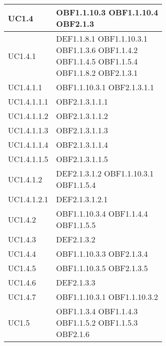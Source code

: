 \documentclass{scalatekids-article}
\begin{document}
\begin{longtable}[H]{|p{5.5cm}|p{5.5cm}|}
\hline
UC1.4 & \multiLineCell[t]{OBF1.1.10.3 OBF1.1.10.4\\OBF2.1.3}\\
\hline
UC1.4.1 & \multiLineCell[t]{DEF1.1.8.1 OBF1.1.10.3.1\\OBF1.1.3.6 OBF1.1.4.2\\OBF1.1.4.5 OBF1.1.5.4\\OBF1.1.8.2 OBF2.1.3.1\\}\\
\hline
UC1.4.1.1 & \multiLineCell[t]{OBF1.1.10.3.1 OBF2.1.3.1.1\\}\\
\hline
UC1.4.1.1.1 & \multiLineCell[t]{OBF2.1.3.1.1.1\\}\\
\hline
UC1.4.1.1.2 & \multiLineCell[t]{OBF2.1.3.1.1.2\\}\\
\hline
UC1.4.1.1.3 & \multiLineCell[t]{OBF2.1.3.1.1.3\\}\\
\hline
UC1.4.1.1.4 & \multiLineCell[t]{OBF2.1.3.1.1.4\\}\\
\hline
UC1.4.1.1.5 & \multiLineCell[t]{OBF2.1.3.1.1.5\\}\\
\hline
UC1.4.1.2 & \multiLineCell[t]{DEF2.1.3.1.2 OBF1.1.10.3.1\\OBF1.1.5.4}\\
\hline
UC1.4.1.2.1 & \multiLineCell[t]{DEF2.1.3.1.2.1\\}\\
\hline
UC1.4.2 & \multiLineCell[t]{OBF1.1.10.3.4 OBF1.1.4.4\\OBF1.1.5.5}\\
\hline
UC1.4.3 & \multiLineCell[t]{DEF2.1.3.2\\}\\
\hline
UC1.4.4 & \multiLineCell[t]{OBF1.1.10.3.3 OBF2.1.3.4\\}\\
\hline
UC1.4.5 & \multiLineCell[t]{OBF1.1.10.3.5 OBF2.1.3.5\\}\\
\hline
UC1.4.6 & \multiLineCell[t]{DEF2.1.3.3\\}\\
\hline
UC1.4.7 & \multiLineCell[t]{OBF1.1.10.3.1 OBF1.1.10.3.2\\}\\
\hline
UC1.5 & \multiLineCell[t]{OBF1.1.3.4 OBF1.1.4.3\\OBF1.1.5.2 OBF1.1.5.3\\OBF2.1.6}\\

\end{longtable}
\end{document}
